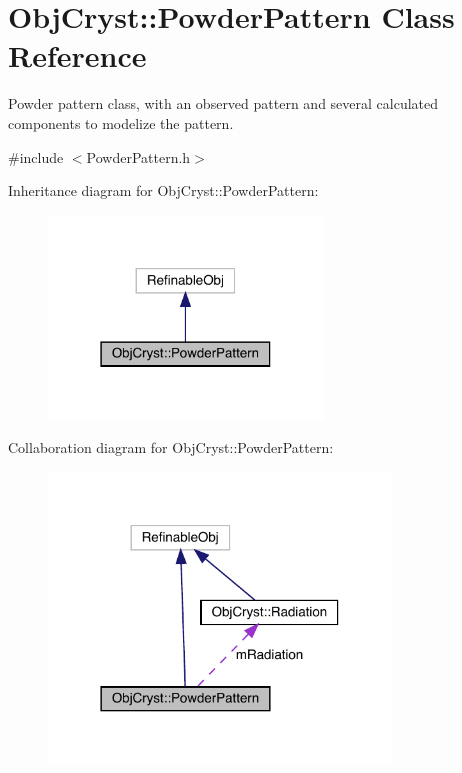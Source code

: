 \hypertarget{class_obj_cryst_1_1_powder_pattern}{}\section{Obj\+Cryst\+::Powder\+Pattern Class Reference}
\label{class_obj_cryst_1_1_powder_pattern}


Powder pattern class, with an observed pattern and several calculated components to modelize the pattern.  




{\ttfamily \#include $<$Powder\+Pattern.\+h$>$}



Inheritance diagram for Obj\+Cryst\+::Powder\+Pattern\+:
\nopagebreak
\begin{figure}[H]
\begin{center}
\leavevmode
\includegraphics[width=207pt]{class_obj_cryst_1_1_powder_pattern__inherit__graph}
\end{center}
\end{figure}


Collaboration diagram for Obj\+Cryst\+::Powder\+Pattern\+:
\nopagebreak
\begin{figure}[H]
\begin{center}
\leavevmode
\includegraphics[width=258pt]{class_obj_cryst_1_1_powder_pattern__coll__graph}
\end{center}
\end{figure}
